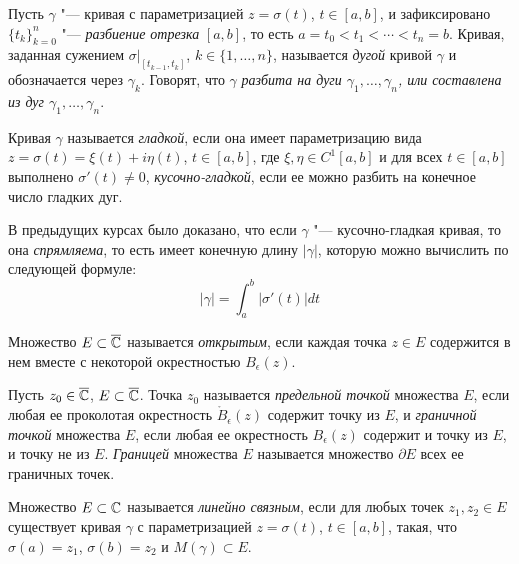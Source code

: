 \begin{definition}
	Пусть $\gamma$ "--- кривая с параметризацией $z = \sigma(t)$, $t \in [a, b]$, и зафиксировано $\{t_k\}_{k = 0}^n$ "--- \textit{разбиение отрезка} $[a, b]$, то есть $a = t_0 < t_1 < \dotsb < t_n = b$. Кривая, заданная сужением $\sigma|_{[t_{k-1}, t_k]}$, $k \in \{1, \dotsc, n\}$, называется \textit{дугой} кривой $\gamma$ и обозначается через $\gamma_k$. Говорят, что $\gamma$ \textit{разбита на дуги $\gamma_1, \dotsc, \gamma_n$, или \textit{составлена} из дуг $\gamma_1, \dotsc, \gamma_n$}.
\end{definition}

\begin{definition}
	Кривая $\gamma$ называется \textit{гладкой}, если она имеет параметризацию вида $z = \sigma(t) = \xi(t) + i\eta(t)$, $t \in [a, b]$, где $\xi, \eta \in C^{1}[a, b]$ и для всех $t \in [a, b]$ выполнено $\sigma'(t) \ne 0$, \textit{кусочно-гладкой}, если ее можно разбить на конечное число гладких дуг.
\end{definition}

\begin{note}
	В предыдущих курсах было доказано, что если $\gamma$ "--- кусочно-гладкая кривая, то она \textit{спрямляема}, то есть имеет конечную длину $|\gamma|$, которую можно вычислить по следующей формуле:
	\[|\gamma| = \int_a^b|\sigma'(t)|dt\]
\end{note}

\begin{definition}
	Множество $E \subset \overline{\mathbb{C}}$ называется \textit{открытым}, если каждая точка $z \in E$ содержится в нем вместе с некоторой окрестностью $B_\epsilon(z)$.
\end{definition}

\begin{definition}
	Пусть $z_0 \in \overline{\mathbb{C}}$, $E \subset \overline{\mathbb{C}}$. Точка $z_0$ называется \textit{предельной точкой} множества $E$, если любая ее проколотая окрестность $\mathring B_\epsilon(z)$ содержит точку из $E$, и \textit{граничной точкой} множества $E$, если любая ее окрестность $B_\epsilon(z)$ содержит и точку из $E$, и точку не из $E$. \textit{Границей} множества $E$ называется множество $\partial E$ всех ее граничных точек.
\end{definition}

\begin{definition}
	Множество $E \subset \mathbb{C}$ называется \textit{линейно связным}, если для любых точек $z_1, z_2 \in E$ существует кривая $\gamma$ с параметризацией $z = \sigma(t)$, $t \in [a, b]$, такая, что $\sigma(a) = z_1$, $\sigma(b) = z_2$ и $M(\gamma) \subset E$.
\end{definition}

